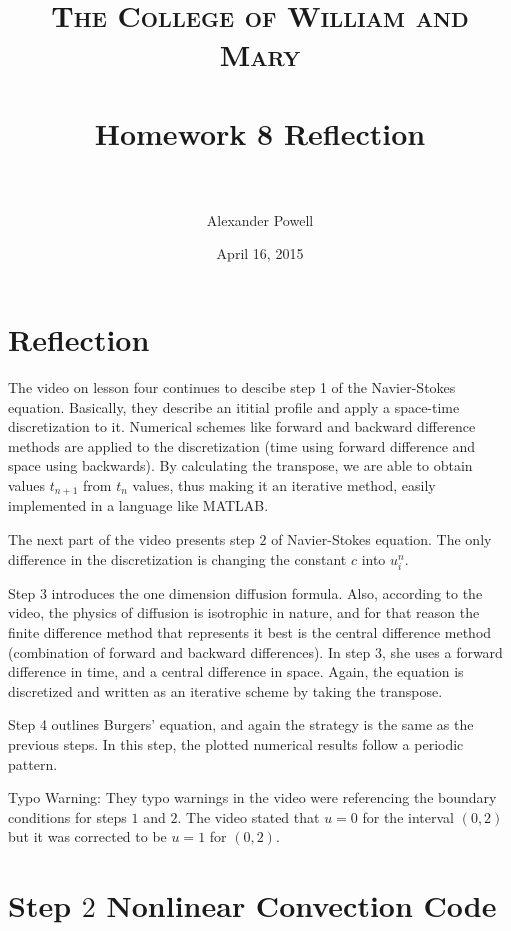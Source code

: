 \documentclass[paper=a4, fontsize=11pt]{scrartcl} %
\title{
    \normalfont \normalsize
    \textsc{The College of William and Mary} \\ [25pt] %
    \horrule{0.5pt} \\[0.4cm] %
    \huge Homework 8 Reflection \\ %
    \horrule{2pt} \\[0.5cm] %
    }
\author{Alexander Powell} %
\date{\normalsize April 16, 2015} %
\numberwithin{equation}{section} %
\numberwithin{figure}{section} %
\numberwithin{table}{section} %
\begin{document}
    \lstset{language=MATLAB}
    \maketitle %
     
     
     \section{Reflection}
         
    The video on lesson four continues to descibe step 1 of the Navier-Stokes equation.  Basically, they describe an ititial profile and apply a space-time discretization to it.  Numerical schemes like forward and backward difference methods are applied to the discretization (time using forward difference and space using backwards).  By calculating the transpose, we are able to obtain values $t_{n+1}$ from $t_n$ values, thus making it an iterative method, easily implemented in a language like MATLAB.  
     
    The next part of the video presents step $2$ of Navier-Stokes equation.  The only difference in the discretization is changing the constant $c$ into $u_i^n$.  
     
    Step 3 introduces the one dimension diffusion formula.  Also, according to the video, the physics of diffusion is isotrophic in nature, and for that reason the finite difference method that represents it best is the central difference method (combination of forward and backward differences).  In step $3$, she uses a forward difference in time, and a central difference in space.  Again, the equation is discretized and written as an iterative scheme by taking the transpose.  
   
    Step 4 outlines Burgers' equation, and again the strategy is the same as the previous steps.  In this step, the plotted numerical results follow a periodic pattern.  
     
     \bigskip
     
    Typo Warning:
    They typo warnings in the video were referencing the boundary conditions for steps $1$ and $2$.  The video stated that $u = 0$ for the interval $(0,2)$ but it was corrected to be $u = 1$ for $(0,2)$.  
   
    \section{Step $2$ Nonlinear Convection Code}
   
\end{document}
